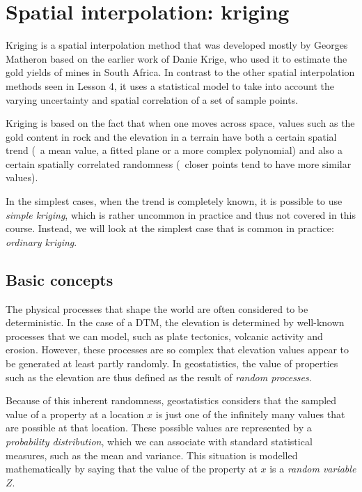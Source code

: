 

\graphicspath{{kriging/}}

\chapter{Spatial interpolation: kriging}


Kriging is a spatial interpolation method that was developed mostly by Georges Matheron based on the earlier work of Danie Krige, who used it to estimate the gold yields of mines in South Africa.
In contrast to the other spatial interpolation methods seen in Lesson 4, it uses a statistical model to take into account the varying uncertainty and spatial correlation of a set of sample points.

Kriging is based on the fact that when one moves across space, values such as the gold content in rock and the elevation in a terrain have both a certain spatial trend (\eg\ a mean value, a fitted plane or a more complex polynomial) and also a certain spatially correlated randomness (\ie\ closer points tend to have more similar values).

In the simplest cases, when the trend is completely known, it is possible to use \emph{simple kriging}, which is rather uncommon in practice and thus not covered in this course.
Instead, we will look at the simplest case that is common in practice: \emph{ordinary kriging}.

\section{Basic concepts}

The physical processes that shape the world are often considered to be deterministic.
In the case of a DTM, the elevation is determined by well-known processes that we can model, such as plate tectonics, volcanic activity and erosion.
However, these processes are so complex that elevation values appear to be generated at least partly randomly.
In geostatistics, the value of properties such as the elevation are thus defined as the result of \emph{random processes}.

Because of this inherent randomness, geostatistics considers that the sampled value of a property at a location \(x\) is just one of the infinitely many values that are possible at that location.
These possible values are represented by a \emph{probability distribution}, which we can associate with standard statistical measures, such as the mean and variance.
This situation is modelled mathematically by saying that the value of the property at \(x\) is a \emph{random variable} \(Z\).

